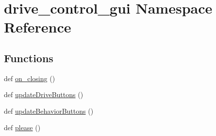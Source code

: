 \hypertarget{namespacedrive__control__gui}{}\section{drive\+\_\+control\+\_\+gui Namespace Reference}
\label{namespacedrive__control__gui}
\subsection*{Functions}
\begin{DoxyCompactItemize}
\item 
def \hyperlink{namespacedrive__control__gui_acec680211aa082b45ccd8c3120c05047}{on\+\_\+closing} ()
\item 
def \hyperlink{namespacedrive__control__gui_a029db361ff6a6cd4c61b575760eb69c9}{update\+Drive\+Buttons} ()
\item 
def \hyperlink{namespacedrive__control__gui_a824767aad654508e6856fff399c45de4}{update\+Behavior\+Buttons} ()
\item 
def \hyperlink{namespacedrive__control__gui_af6cc6f9b64108186bcc737e71ab3f7d2}{please} ()
\end{DoxyCompactItemize}
